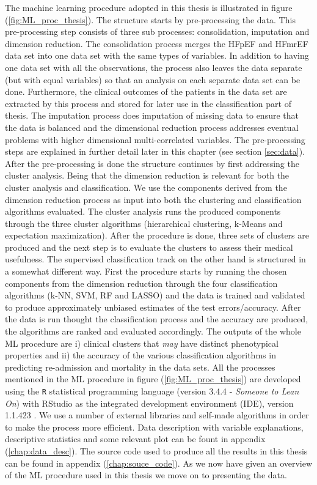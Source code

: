 \documentclass[../thesis.tex]{subfiles}
\begin{document}
\indent The machine learning procedure adopted in this thesis is illustrated in figure (\ref{fig:ML_proc_thesis}). The structure starts by pre-processing the data. This pre-processing step consists of three sub processes: consolidation, imputation and dimension reduction. The consolidation process merges the HFpEF and HFmrEF data set into one data set with the same types of variables. In addition to having one data set with all the observations, the process also leaves the data separate (but with equal variables) so that an analysis on each separate data set can be done. Furthermore, the clinical outcomes of the patients in the data set are extracted by this process and stored for later use in the classification part of thesis. The imputation process does imputation of missing data to ensure that the data is balanced and the dimensional reduction process addresses eventual problems with higher dimensional multi-correlated variables. The pre-processing steps are explained in further detail later in this chapter (see section \ref{sec:data}). After the pre-processing is done the structure continues by first addressing the cluster analysis. Being that the dimension reduction is relevant for both the cluster analysis and classification. We use the components derived from the dimension reduction process as input into both the clustering and classification algorithms evaluated. The cluster analysis runs the produced components through the three cluster algorithms (hierarchical clustering, k-Means and expectation maximization). After the procedure is done, three sets of clusters are produced and the next step is to evaluate the clusters to assess their medical usefulness. The supervised classification track on the other hand is structured in a somewhat different way. First the procedure starts by running the chosen components from the dimension reduction through the four classification algorithms (k-NN, SVM, RF and LASSO) and the data is trained and validated to produce approximately unbiased estimates of the test errors/accuracy. After the data is run thought the classification process and the accuracy are produced, the algorithms are ranked and evaluated accordingly. The outputs of the whole ML procedure are i) clinical clusters that \textit{may} have distinct phenotypical properties and ii) the accuracy of the various classification algorithms in predicting re-admission and mortality in the data sets. All the processes mentioned in the ML procedure in figure (\ref{fig:ML_proc_thesis}) are developed using the \texttt{R} statistical programming language (version 3.4.4 - \textit{Someone to Lean On}) \citep{Rsoftware2018} with RStudio as the integrated development environment (IDE), version 1.1.423 \citep{RStudio2018}. We use a number of external libraries and self-made algorithms in order to make the process more efficient. Data description with variable explanations, descriptive statistics and some relevant plot can be fount in appendix (\ref{chap:data_desc}). The source code used to produce all the results in this thesis can be found in appendix (\ref{chap:souce_code}). As we now have given an overview of the ML procedure used in this thesis we move on to presenting the data.
\end{document}
